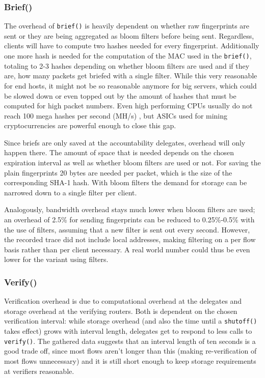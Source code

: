 \documentclass{acm_proc_article-sp}
\begin{document}
\subsubsection{Brief()}
The overhead of \texttt{brief()} is heavily dependent on whether raw fingerprints are sent or they are being aggregated as bloom filters before being sent. Regardless, clients will have to compute two hashes needed for every fingerprint. Additionally one more hash is needed for the computation of the MAC used in the \texttt{brief()}, totaling to 2-3 hashes depending on whether bloom filters are used and if they are, how many packets get briefed with a single filter. While this very reasonable for end hosts, it might not be so reasonable anymore for big servers, which could be slowed down or even topped out by the amount of hashes that must be computed for high packet numbers. Even high performing CPUs usually do not reach 100 mega hashes per second (MH/s) \cite{hashes}, but ASICs used for mining cryptocurrencies are powerful enough to close this gap.

Since briefs are only saved at the accountability delegates, overhead will only happen there. The amount of space that is needed depends on the chosen expiration interval as well as whether bloom filters are used or not. For saving the plain fingerprints 20 bytes are needed per packet, which is the size of the corresponding SHA-1 hash. With bloom filters the demand for storage can be narrowed down to a single filter per client.

Analogously, bandwidth overhead stays much lower when bloom filters are used; an overhead of 2.5\% for sending fingerprints can be reduced to 0.25\%-0.5\% with the use of filters, assuming that a new filter is sent out every second. However, the recorded trace did not include local addresses, making filtering on a per flow basis rather than per client necessary. A real world number could thus be even lower for the variant using filters.

\subsubsection{Verify()}
Verification overhead is due to computational overhead at the delegates and storage overhead at the verifying routers. Both is dependent on the chosen verification interval: while storage overhead (and also the time until a \texttt{shutoff()} takes effect) grows with interval length, delegates get to respond to less calls to \texttt{verify()}. The gathered data suggests that an interval length of ten seconds is a good trade off, since most flows aren't longer than this (making re-verification of most flows unnecessary) and it is still short enough to keep storage requirements at verifiers reasonable.
\end{document}
